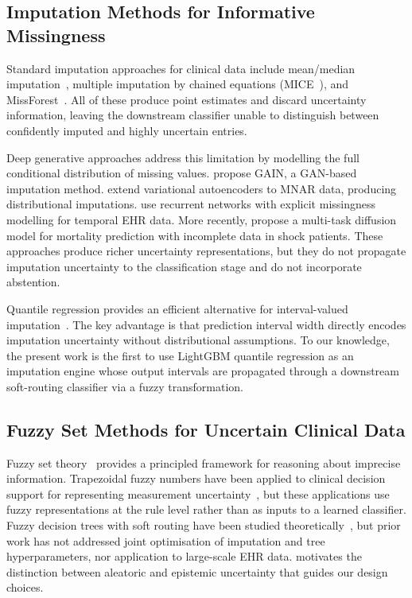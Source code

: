 \documentclass[a4paper,fleqn,longmktitle]{cas-sc}
\begin{document}
	\subsection{Imputation Methods for Informative Missingness}
	\label{sec:rw_imputation}
	
	Standard imputation approaches for clinical data include mean/median
	imputation~\citep{sterne2009multiple}, multiple imputation by chained
	equations (MICE~\citep{van2011mice}), and
	MissForest~\citep{stekhoven2012missforest}.
	All of these produce point estimates and discard uncertainty
	information, leaving the downstream classifier unable to distinguish
	between confidently imputed and highly uncertain entries.
	
	Deep generative approaches address this limitation by modelling
	the full conditional distribution of missing values.
	\citet{yoon2018gain} propose GAIN, a GAN-based imputation method.
	\citet{ipsen2020not} extend variational autoencoders to MNAR data,
	producing distributional imputations.
	\citet{ma2020mimic} use recurrent networks with explicit missingness
	modelling for temporal EHR data.
	More recently, \citet{zhao2024multitask} propose a multi-task
	diffusion model for mortality prediction with incomplete data in
	shock patients.
	These approaches produce richer uncertainty representations, but
	they do not propagate imputation uncertainty to the classification
	stage and do not incorporate abstention.
	
	Quantile regression provides an efficient alternative for
	interval-valued imputation~\citep{meinshausen2006quantile}.
	The key advantage is that prediction interval width directly
	encodes imputation uncertainty without distributional assumptions.
	To our knowledge, the present work is the first to use LightGBM
	quantile regression as an imputation engine whose output intervals
	are propagated through a downstream soft-routing classifier via a
	fuzzy transformation.
	
	\subsection{Fuzzy Set Methods for Uncertain Clinical Data}
	\label{sec:rw_fuzzy}
	
	Fuzzy set theory~\citep{zadeh1965fuzzy} provides a principled
	framework for reasoning about imprecise information.
	Trapezoidal fuzzy numbers have been applied to clinical decision
	support for representing measurement
	uncertainty~\citep{adlassnig1986fuzzy, torres2013fuzzy},
	but these applications use fuzzy representations at the rule level
	rather than as inputs to a learned classifier.
	Fuzzy decision trees with soft routing have been studied
	theoretically~\citep{olaru2003complete, yuan1995induction},
	but prior work has not addressed joint optimisation of imputation
	and tree hyperparameters, nor application to large-scale EHR data.
	\citet{hullermeier2021aleatoric} motivates the distinction between
	aleatoric and epistemic uncertainty that guides our design choices.
	
\end{document}
